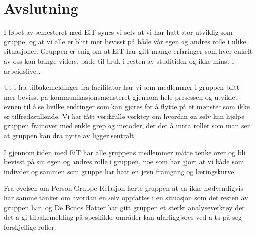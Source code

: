 \section{Avslutning}

I løpet av semesteret med EiT synes vi selv at vi har hatt stor utviklig som gruppe, og at vi alle er blitt mer bevisst på både
vår egen og andres rolle i ulike situasjoner. Gruppen er enig om at EiT har gitt mange erfaringer
som hver enkelt av oss kan bringe videre, både til bruk i resten av studitiden og ikke minst i arbeidslivet. 


Ut i fra tilbakemeldinger fra facilitator har vi som medlemmer i gruppen blitt mer bevisst på kommunikasjonsmønsteret 
gjennom hele prosessen og utviklet evnen til å se hvilke endringer som kan gjøres for å flytte på et mønster 
som ikke er tilfredsstillende. Vi har fått verdifulle 
verktøy om hvordan en selv kan hjelpe gruppen framover med enkle grep og metoder, der det å innta 
roller som man ser at gruppen kan dra nytte av ligger sentralt.

I gjennom tiden med EiT har alle gruppens medlemmer måtte tenke over og bli bevisst på sin egen og andres rolle
i gruppen, noe som har gjort at vi både som indivder og sammen som gruppe har hatt en jevn framgang og læringskurve.

Fra øvelsen om Person-Gruppe Relasjon lærte gruppen at en ikke nødvendigvis har samme tanker om hvordan en selv
oppfattes i en situasjon som det resten av gruppen har, og De Bonos Hatter har gitt gruppen et sterkt analyseverktøy 
der det å gi tilbakemelding på spesifikke
områder kan ufarliggjøres ved å ta på seg forskjellige roller. 

